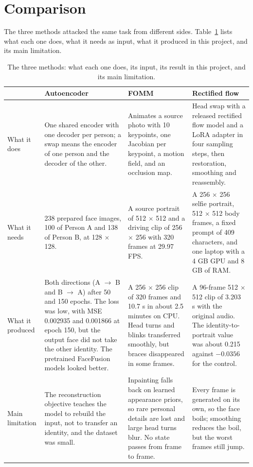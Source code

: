 
\section{Comparison}

The three methods attacked the same task from different sides.
Table~\ref{tab:comparison} lists what each one does, what it needs as input, what
it produced in this project, and its main limitation.

\begin{table}[tb]
  \centering
  \footnotesize
  \setlength{\tabcolsep}{4pt}
  \begin{tabular}{@{}p{} p{} p{} p{}@{}}
    \toprule
    & \textbf{Autoencoder} & \textbf{FOMM} & \textbf{Rectified flow} \\
    \midrule
    What it does
    & One shared encoder with one decoder per person; a swap means the encoder of one person and the decoder of the other.
    & Animates a source photo with 10 keypoints, one Jacobian per keypoint, a motion field, and an occlusion map.
    & Head swap with a released rectified flow model and a LoRA adapter in four sampling steps, then restoration, smoothing and reassembly. \\
    \midrule
    What it needs
    & 238 prepared face images, 100 of Person A and 138 of Person B, at 128 $\times$ 128.
    & A source portrait of 512 $\times$ 512 and a driving clip of 256 $\times$ 256 with 320 frames at 29.97 FPS.
    & A 256 $\times$ 256 selfie portrait, 512 $\times$ 512 body frames, a fixed prompt of 409 characters, and one laptop with a 4 GB GPU and 8 GB of RAM. \\
    \midrule
    What it produced
    & Both directions (A $\rightarrow$ B and B $\rightarrow$ A) after 50 and 150 epochs. The loss was low, with MSE 0.002935 and 0.001866 at epoch 150, but the output face did not take the other identity. The pretrained FaceFusion models looked better.
    & A 256 $\times$ 256 clip of 320 frames and 10.7 s in about 2.5 minutes on CPU. Head turns and blinks transferred smoothly, but braces disappeared in some frames.
    & A 96-frame 512 $\times$ 512 clip of 3.203 s with the original audio. The identity-to-portrait value was about 0.215 against $-0.0356$ for the control. \\
    \midrule
    Main limitation
    & The reconstruction objective teaches the model to rebuild the input, not to transfer an identity, and the dataset was small.
    & Inpainting falls back on learned appearance priors, so rare personal details are lost and large head turns blur. No state passes from frame to frame.
    & Every frame is generated on its own, so the face boils; smoothing reduces the boil, but the worst frames still jump. \\
    \bottomrule
  \end{tabular}
  \caption{The three methods: what each one does, its input, its result in this
    project, and its main limitation.}
  \label{tab:comparison}
\end{table}

